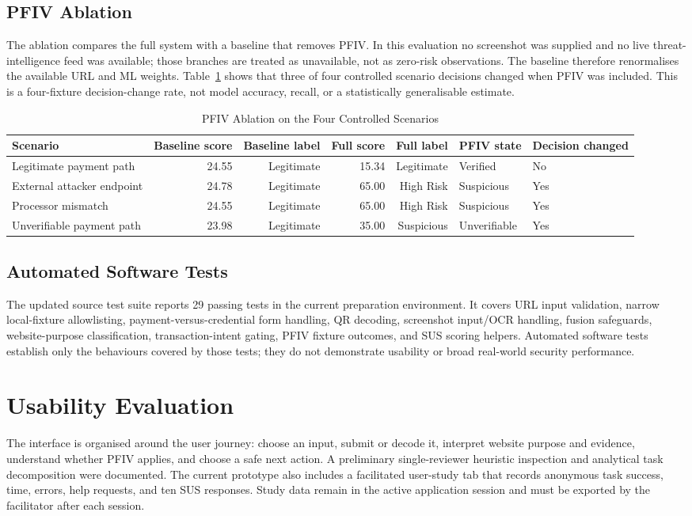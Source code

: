 \documentclass[conference]{IEEEtran}
\begin{document}
\subsection{PFIV Ablation}
The ablation compares the full system with a baseline that removes PFIV. In this evaluation no screenshot was supplied and no live threat-intelligence feed was available; those branches are treated as unavailable, not as zero-risk observations. The baseline therefore renormalises the available URL and ML weights. Table~\ref{tab:ablation} shows that three of four controlled scenario decisions changed when PFIV was included. This is a four-fixture decision-change rate, not model accuracy, recall, or a statistically generalisable estimate.

\begin{table}[t]
\caption{PFIV Ablation on the Four Controlled Scenarios}
\label{tab:ablation}
\centering
\scriptsize
\begin{tabular}{lrrrrll}
\toprule
Scenario & Baseline score & Baseline label & Full score & Full label & PFIV state & Decision changed \\
\midrule
Legitimate payment path & 24.55 & Legitimate & 15.34 & Legitimate & Verified & No \\
External attacker endpoint & 24.78 & Legitimate & 65.00 & High Risk & Suspicious & Yes \\
Processor mismatch & 24.55 & Legitimate & 65.00 & High Risk & Suspicious & Yes \\
Unverifiable payment path & 23.98 & Legitimate & 35.00 & Suspicious & Unverifiable & Yes \\
\bottomrule
\end{tabular}
\end{table}

\subsection{Automated Software Tests}
The updated source test suite reports 29 passing tests in the current preparation environment. It covers URL input validation, narrow local-fixture allowlisting, payment-versus-credential form handling, QR decoding, screenshot input/OCR handling, fusion safeguards, website-purpose classification, transaction-intent gating, PFIV fixture outcomes, and SUS scoring helpers. Automated software tests establish only the behaviours covered by those tests; they do not demonstrate usability or broad real-world security performance.

\section{Usability Evaluation}
The interface is organised around the user journey: choose an input, submit or decode it, interpret website purpose and evidence, understand whether PFIV applies, and choose a safe next action. A preliminary single-reviewer heuristic inspection and analytical task decomposition were documented. The current prototype also includes a facilitated user-study tab that records anonymous task success, time, errors, help requests, and ten SUS responses. Study data remain in the active application session and must be exported by the facilitator after each session.
\end{document}

